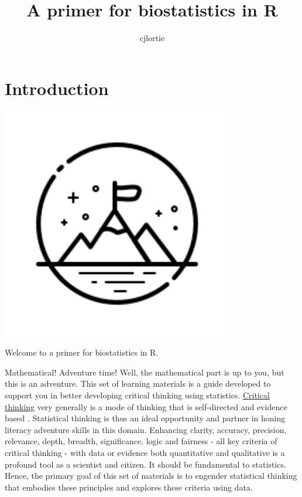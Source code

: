\documentclass[
]{book}
\title{A primer for biostatistics in R}
\author{cjlortie}
\date{}
\begin{document}
\maketitle

{
\setcounter{tocdepth}{1}
\tableofcontents
}
\hypertarget{introduction}{%
\chapter{Introduction}\label{introduction}}

\includegraphics[width=4in,height=\textheight]{./adventure.png}

Welcome to a primer for biostatistics in R.

Mathematical! Adventure time! Well, the mathematical part is up to you, but this is an adventure. This set of learning materials is a guide developed to support you in better developing critical thinking using statistics. \href{https://www.criticalthinking.org/pages/defining-critical-thinking/766}{Critical thinking} very generally is a mode of thinking that is self-directed and evidence based \citep{RN6081}. Statistical thinking is thus an ideal opportunity and partner in honing literacy adventure skills in this domain. Enhancing clarity, accuracy, precision, relevance, depth, breadth, significance, logic and fairness - all key criteria of critical thinking - with data or evidence both quantitative and qualitative is a profound tool as a scientist and citizen. It should be fundamental to statistics. Hence, the primary goal of this set of materials is to engender statistical thinking that embodies these principles and explores these criteria using data.
\end{document}

